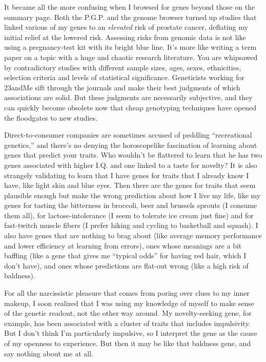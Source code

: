 It became all the more confusing when I browsed for genes beyond those
on the summary page. Both the P.G.P. and the genome browser turned up
studies that linked various of my genes to an \emph{elevated} risk of
prostate cancer, deflating my initial relief at the lowered risk.
Assessing risks from genomic data is not like using a pregnancy-test kit
with its bright blue line. It's more like writing a term paper on a
topic with a huge and chaotic research literature. You are whipsawed by
contradictory studies with different sample sizes, ages, sexes,
ethnicities, selection criteria and levels of statistical significance.
Geneticists working for 23andMe sift through the journals and make their
best judgments of which associations are solid. But these judgments are
necessarily subjective, and they can quickly become obsolete now that
cheap genotyping techniques have opened the floodgates to new studies.

Direct-to-consumer companies are sometimes accused of peddling
``recreational genetics,'' and there's no denying the horoscopelike
fascination of learning about genes that predict your traits. Who
wouldn't be flattered to learn that he has two genes associated with
higher I.Q. and one linked to a taste for novelty? It is also strangely
validating to learn that I have genes for traits that I already know I
have, like light skin and blue eyes. Then there are the genes for traits
that seem plausible enough but make the wrong prediction about how I
live my life, like my genes for tasting the bitterness in broccoli, beer
and brussels sprouts (I consume them all), for lactose-intolerance (I
seem to tolerate ice cream just fine) and for fast-twitch muscle fibers
(I prefer hiking and cycling to basketball and squash). I also have
genes that are nothing to brag about (like average memory performance
and lower efficiency at learning from errors), ones whose meanings are a
bit baffling (like a gene that gives me ``typical odds'' for having red
hair, which I don't have), and ones whose predictions are flat-out wrong
(like a high risk of baldness).

For all the narcissistic pleasure that comes from poring over clues to
my inner makeup, I soon realized that I was using my knowledge of myself
to make sense of the genetic readout, not the other way around. My
novelty-seeking gene, for example, has been associated with a cluster of
traits that includes impulsivity. But I don't think I'm particularly
impulsive, so I interpret the gene as the cause of my openness to
experience. But then it may be like that baldness gene, and say nothing
about me at all.

